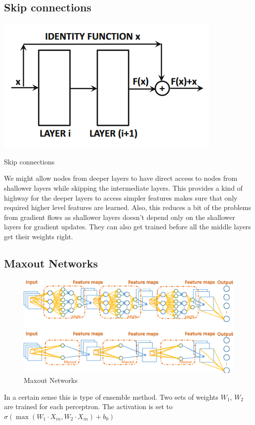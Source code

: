 \subsection{Skip connections}
\begin{marginfigure}
    \includegraphics[width=\textwidth]{graphics/skip.png}
    \caption{Skip connections
    \citep{aggarwal2018neural}}
\end{marginfigure}
We might allow nodes from deeper layers to
have direct access to nodes from shallower
layers while skipping the intermediate
layers. This provides a kind of highway for the
deeper layers to access simpler features makes sure that only required higher level features are learned. Also, this reduces a bit of the problems from gradient flows as shallower layers doesn't depend only on the shallower layers for gradient updates. They can also get trained before all the middle layers get their weights right.
\subsection{Maxout Networks}
\begin{figure}
    \includegraphics[width=\textwidth]{graphics/maxout.png}
    \caption{Maxout Networks\citep{sun2018improving}}
\end{figure}
\noindent In a certain sense this is type of ensemble
method. Two sets of weights $W_1$, $W_2$ are trained for
each perceptron. The activation is set to
$\sigma (\max(W_1 \cdot X_{in} , W_2 \cdot X_{in} ) + b_0)$
